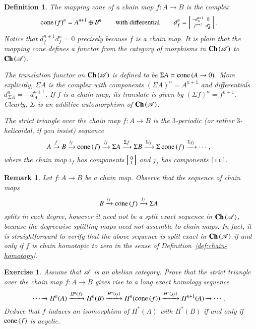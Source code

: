 \documentclass[1p]{elsarticle}
\theoremstyle{mythm}
\theoremstyle{mydef}
\newtheorem{Exer}[Thm]{Exercise}
\newtheorem{Rem}[Thm]{Remark}
\newtheorem{Def}[Thm]{Definition}
\begin{document}
\begin{Def}
  The \emph{mapping cone} of a chain map $f: A \to B$ is
  the complex
  \[
  \operatorname{cone}{(f)}^{n} = A^{n+1} \oplus B^{n}
  \qquad \text{with differential} \qquad 
  d_{f}^{n} = \left[\begin{smallmatrix} -d_{A}^{n+1} & 0 \\ f^{n+1} & d_{B}^{n} \end{smallmatrix}\right].
  \]
  Notice that $d_{f}^{n+1} d_{f}^{n} = 0$ precisely because $f$ is a chain
  map. It is plain that the mapping cone 
  defines a functor from the category of
  morphisms in $\operatorname{\mathbf{Ch}}{(\operatorname{\mathscr{A}})}$ to $\operatorname{\mathbf{Ch}}{(\operatorname{\mathscr{A}})}$.

  The \emph{translation functor} on $\operatorname{\mathbf{Ch}}{(\operatorname{\mathscr{A}})}$ is defined to be
  $\Sigma A = \operatorname{cone}{(A \to 0)}$. 
  More explicitly, $\Sigma A$ is the complex with components
  $(\Sigma A)^{n} = A^{n+1}$ and differentials
  $d_{\Sigma A}^{n} = - d_{A}^{n+1}$. If $f$ is a chain map, its
  translate is given by $(\Sigma f)^{n} = f^{n+1}$. Clearly, $\Sigma$
  is an additive automorphism of $\operatorname{\mathbf{Ch}}{(\operatorname{\mathscr{A}})}$.

  The \emph{strict triangle} over the chain map $f: A \to B$ is the
  $3$-periodic (or rather $3$-helicoidal, if you insist) sequence
  \[
  A \xrightarrow{f} B \xrightarrow{i_{f}} \operatorname{cone}{(f)} \xrightarrow{j_{f}}
  \Sigma A \xrightarrow{\Sigma f} \Sigma B \xrightarrow{\Sigma i_{f}}
  \Sigma \operatorname{cone}{(f)} \xrightarrow{\Sigma j_{f}} \cdots,
  \]
  where the chain map $i_{f}$ has components $\left[\begin{smallmatrix} 0 \\ 1 \end{smallmatrix}\right]$ and $j_{f}$ has
  components $\left[\begin{smallmatrix} 1 & 0 \end{smallmatrix}\right]$.
\end{Def}



\begin{Rem}
  \label{rem:strict-triangle}
  Let $f: A \to B$ be a chain map.
  Observe that the sequence of chain maps
  \[
  B \xrightarrow{i_{f}} \operatorname{cone}{(f)} \xrightarrow{j_{f}} \Sigma A
  \]
  splits in each degree, however it need not be a split exact sequence
  in $\operatorname{\mathbf{Ch}}{(\operatorname{\mathscr{A}})}$, because the degreewise 
  splitting maps need not assemble to chain maps. In fact, it is 
  straightforward to verify that the above sequence is split exact in
  $\operatorname{\mathbf{Ch}}{(\operatorname{\mathscr{A}})}$ if and only if $f$ is chain homotopic to zero in the
  sense of Definition~\ref{def:chain-homotopy}.
\end{Rem}

\begin{Exer}
  \label{exer:str-tr-long-ex-seq}
  Assume that $\operatorname{\mathscr{A}}$ is an abelian category. Prove that the strict
  triangle over the chain map $f:A \to B$ 
  gives rise to a long exact homology sequence
  \[
  \cdots  \xrightarrow{} 
  H^{n}(A) \xrightarrow{H^{n}(f)} 
  H^{n}(B) \xrightarrow{H^{n}(i_{f})}
  H^{n}{(\operatorname{cone}{(f)})} \xrightarrow{H^{n}{(j_{f})}} H^{n+1}{(A)}
  \xrightarrow{}\cdots.
  \]
  Deduce that $f$ induces an isomorphism of $H^{\ast}(A)$ with
  $H^{\ast}(B)$ if and only if $\operatorname{cone}{(f)}$ is acyclic.
\end{Exer}
\end{document}
